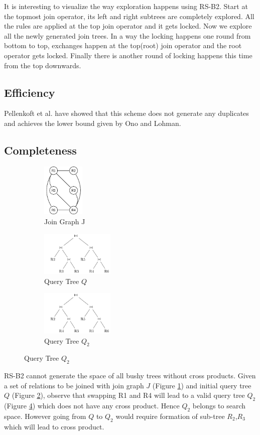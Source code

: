 It is interesting to visualize the way exploration happens using RS-B2. Start at the topmost join operator, its left and right subtrees are completely explored. All the rules are applied at the top join operator and it gets locked. Now we explore all the newly generated join trees. In a way the locking happens one round from bottom to top, exchanges happen at the top(root) join operator and the root operator gets locked. Finally there is another round of locking happens this time from the top downwards. 

\subsection{Efficiency}
Pellenkoft et al. have showed that this scheme does not generate any duplicates and achieves the lower bound given by Ono and Lohman.


\subsection{Completeness}

\begin{figure}[ht]
\centering
\begin{subfigure}[b]{0.24\linewidth}
\includegraphics[width=2cm]{Figures/rsb2-predicates.pdf}
\caption{Join Graph J}
\label{fig:rsb2-counter}
\end{subfigure}
\begin{subfigure}[b]{0.35\linewidth}
	\includegraphics[width=3.5cm]{Figures/rsb2-counter.pdf}
\caption{Query Tree $Q$}
\label{fig:minipage1}
\end{subfigure}
\begin{subfigure}[b]{0.35\linewidth}
	\includegraphics[width=3.5cm]{Figures/rsb2-counter2.pdf}
\caption{Query Tree $Q_{2}$}
\label{fig:minipage2}
\end{subfigure}
\end{figure}
RS-B2 cannot generate the space of all bushy trees without cross products. Given a set of relations to be joined with join graph $J$ (Figure \ref{fig:rsb2-counter}) and initial query tree $Q$ (Figure \ref{fig:minipage1}), observe that swapping R1 and R4 will lead to a valid query tree $Q_2$ (Figure \ref{fig:minipage2}) which does not have any cross product. Hence $Q_2$ belongs to search space. However going from $Q$ to $Q_2$ would require formation of sub-tree $R_2$,$R_3$ which will lead to cross product.